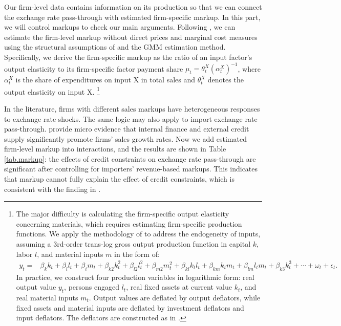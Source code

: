 Our firm-level data contains information on its production so that we can connect the exchange rate pass-through with estimated firm-specific markup. In this part, we will control markups to check our main arguments. Following \cite{bkl2021}, we can estimate the firm-level markup without direct prices and marginal cost measures using the structural assumptions of \cite{dlw2012} and the GMM estimation method. Specifically, we derive the firm-specific markup as the ratio of an input factor's output elasticity to its firm-specific factor payment share $\mu_{t}=\theta_{t}^{X}\left(\alpha_{t}^{X}\right)^{-1}$, where $\alpha_{t}^{X}$ is the share of expenditures on input X in total sales and $\theta^X_t$ denotes the output elasticity on input X. \footnote{The major difficulty is calculating the firm-specific output elasticity concerning materials, which requires estimating firm-specific production functions. We apply the methodology of \cite{acf2015} to address the endogeneity of inputs, assuming a 3rd-order trans-log gross output production function in capital $k$, labor $l$, and material inputs $m$ in the form of:
$$
\begin{aligned}
	y_{t}= &\beta_{k} k_{t}+\beta_{l} l_{t}+\beta_{i} m_{t}+\beta_{k 2} k_{t}^{2}+\beta_{l 2} l_{t}^{2}+\beta_{m 2} m_{t}^{2}+\beta_{k l} k_{ t} l_{t}+\beta_{k m} k_{t} m_{t}+\beta_{l m} l_{t} m_{t}+\beta_{k 3} k_{t}^{3}+\cdots+\omega_{t}+\epsilon_{t}.
\end{aligned}
$$
In practice, we construct four production variables in logarithmic form: real output value $y_t$, persons engaged $l_t$, real fixed assets at current value $k_t$, and real material inputs $m_t$. Output values are deflated by output deflators, while fixed assets and material inputs are deflated by investment deflators and input deflators. The deflators are constructed as in \cite{brandt2012}.}

In the literature, firms with different sales markups have heterogeneous responses to exchange rate shocks. The same logic may also apply to import exchange rate pass-through. \cite{llz2018} provide micro evidence that internal finance and external credit supply significantly promote firms' sales growth rates. Now we add estimated firm-level markup into interactions, and the results are shown in Table \ref{tab.markup}: the effects of credit constraints on exchange rate pass-through are significant after controlling for importers' revenue-based markups. This indicates that markup cannot fully explain the effect of credit constraints, which is consistent with the finding in \cite{xu-guo2021}.

